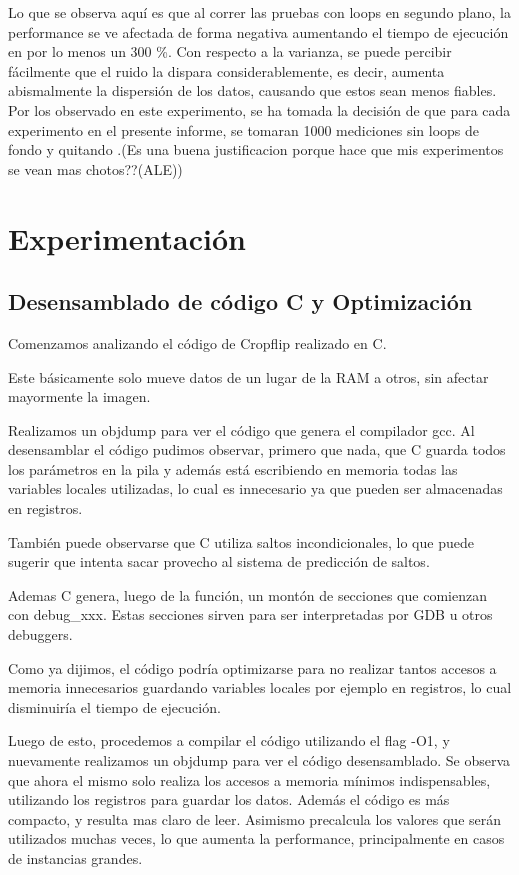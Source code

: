 \documentclass[a4paper]{article}
\begin{document}
Lo que se observa aquí es que al correr las pruebas con loops en segundo plano, la performance se ve afectada de forma negativa aumentando el tiempo de ejecución en por lo menos un 300 \%. Con respecto a la varianza, se puede percibir fácilmente que el ruido la dispara considerablemente, es decir, aumenta abismalmente la dispersión de los datos, causando que estos sean menos fiables.
Por los observado en este experimento, se ha tomada la decisión de que para cada experimento en el presente informe, se tomaran 1000 mediciones sin loops de fondo y quitando .(Es una buena justificacion porque hace que mis experimentos se vean mas chotos??(ALE))

\newpage

\section{Experimentación}

\subsection{Desensamblado de código C y Optimización}

Comenzamos analizando el código de Cropflip realizado en C.

Este básicamente solo mueve datos de un lugar de la RAM a otros, sin afectar mayormente la imagen.

Realizamos un objdump para ver el código que genera el compilador gcc. Al desensamblar el código pudimos observar, primero que nada, que C guarda todos los parámetros en la pila y además está escribiendo en memoria todas las variables locales utilizadas, lo cual es innecesario ya que pueden ser almacenadas en registros.

También puede observarse que C utiliza saltos incondicionales, lo que puede sugerir que intenta sacar provecho al sistema de predicción de saltos.

Ademas C genera, luego de la función, un montón de secciones que comienzan con debug_xxx. Estas secciones sirven para ser interpretadas por GDB u otros debuggers.

Como ya dijimos, el código podría optimizarse para no realizar tantos accesos a memoria innecesarios guardando variables locales por ejemplo en registros, lo cual disminuiría el tiempo de ejecución.

Luego de esto, procedemos a compilar el código utilizando el flag -O1, y nuevamente realizamos un objdump para ver el código desensamblado. Se observa que ahora el mismo solo realiza los accesos a memoria mínimos indispensables, utilizando los registros para guardar los datos. Además el código es más compacto, y resulta mas claro de leer. Asimismo precalcula los valores que serán utilizados muchas veces, lo que aumenta la performance, principalmente en casos de instancias grandes.
\end{document}
